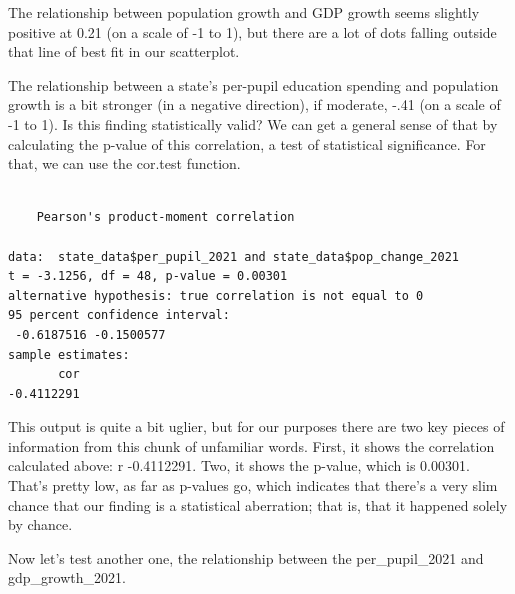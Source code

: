 \documentclass[
  letterpaper,
  DIV=11,
  numbers=noendperiod]{scrreprt}
\newenvironment{Shaded}{\begin{snugshade}}{\end{snugshade}}
\newcommand{\FunctionTok}[1]{\textcolor[rgb]{0.28,0.35,0.67}{#1}}
\newcommand{\NormalTok}[1]{\textcolor[rgb]{0.00,0.23,0.31}{#1}}
\newcommand{\SpecialCharTok}[1]{\textcolor[rgb]{0.37,0.37,0.37}{#1}}
\begin{document}
The relationship between population growth and GDP growth seems slightly
positive at 0.21 (on a scale of -1 to 1), but there are a lot of dots
falling outside that line of best fit in our scatterplot.

The relationship between a state's per-pupil education spending and
population growth is a bit stronger (in a negative direction), if
moderate, -.41 (on a scale of -1 to 1). Is this finding statistically
valid? We can get a general sense of that by calculating the p-value of
this correlation, a test of statistical significance. For that, we can
use the cor.test function.

\begin{Shaded}
\end{Shaded}

\begin{verbatim}

    Pearson's product-moment correlation

data:  state_data$per_pupil_2021 and state_data$pop_change_2021
t = -3.1256, df = 48, p-value = 0.00301
alternative hypothesis: true correlation is not equal to 0
95 percent confidence interval:
 -0.6187516 -0.1500577
sample estimates:
       cor 
-0.4112291 
\end{verbatim}

This output is quite a bit uglier, but for our purposes there are two
key pieces of information from this chunk of unfamiliar words. First, it
shows the correlation calculated above: r -0.4112291. Two, it shows the
p-value, which is 0.00301. That's pretty low, as far as p-values go,
which indicates that there's a very slim chance that our finding is a
statistical aberration; that is, that it happened solely by chance.

Now let's test another one, the relationship between the
per\_pupil\_2021 and gdp\_growth\_2021.

\begin{Shaded}
\end{Shaded}
\end{document}
